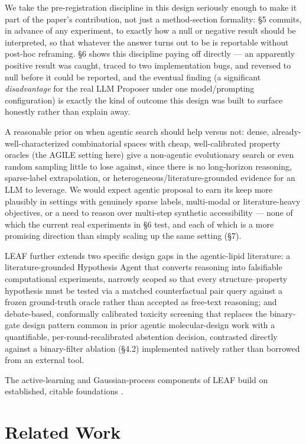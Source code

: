 \documentclass{article}
\begin{document}
We take the pre-registration discipline in this design seriously enough
to make it part of the paper's contribution, not just a method-section
formality: \S5 commits, in advance of any experiment, to exactly how a
null or negative result should be interpreted, so that whatever the
answer turns out to be is reportable without post-hoc reframing. \S6
shows this discipline paying off directly --- an apparently positive
result was caught, traced to two implementation bugs, and reversed to
null before it could be reported, and the eventual finding (a
significant \emph{disadvantage} for the real LLM Proposer under one
model/prompting configuration) is exactly the kind of outcome this
design was built to surface honestly rather than explain away.

A reasonable prior on when agentic search should help versus not: dense,
already-well-characterized combinatorial spaces with cheap,
well-calibrated property oracles (the AGILE setting here) give a
non-agentic evolutionary search or even random sampling little to lose
against, since there is no long-horizon reasoning, sparse-label
extrapolation, or heterogeneous/literature-grounded evidence for an LLM
to leverage. We would expect agentic proposal to earn its keep more
plausibly in settings with genuinely sparse labels, multi-modal or
literature-heavy objectives, or a need to reason over multi-step
synthetic accessibility --- none of which the current real experiments
in \S6 test, and each of which is a more promising direction than simply
scaling up the same setting (\S7).

LEAF further extends two specific design gaps in the agentic-lipid
literature: a literature-grounded Hypothesis Agent that converts reasoning
into falsifiable computational experiments, narrowly scoped so that every
structure--property hypothesis must be tested via a matched counterfactual
pair query against a frozen ground-truth oracle rather than accepted as
free-text reasoning; and debate-based, conformally calibrated toxicity
screening that replaces the binary-gate design pattern common in prior
agentic molecular-design work with a quantifiable, per-round-recalibrated
abstention decision, contrasted directly against a binary-filter ablation
(\S4.2) implemented natively rather than borrowed from an external tool.

The active-learning and Gaussian-process components of LEAF build on
established, citable foundations
\citep{srinivas2009,gessner2024,rasmussen2006}.

\section{Related Work}
\end{document}
